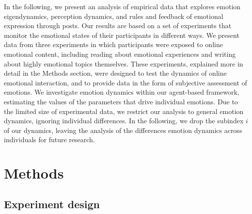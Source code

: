 \documentclass[nologo,url,11pt,a4paper]{ETHpaper}
\begin{document}
In the following, we present an analysis of empirical data that explores emotion eigendynamics, perception dynamics, and rules and feedback of emotional expression through posts. 
Our results are based on a set of experiments that monitor the emotional states of their
participants in different ways.   
We present data from three experiments in which participants were exposed to online emotional content, including reading about emotional experiences and writing about highly emotional topics themselves. 
These experiments, explained more in detail in the Methods section, were designed to test the dynamics of online emotional interaction, and to provide data in the form of subjective assessment of emotions. 
We investigate emotion dynamics within our agent-based framework, estimating the values of the parameters that drive individual emotions.  
Due to the limited size of experimental data, we restrict our analysis to general emotion dynamics, ignoring individual differences. In the following, we drop the subindex $i$ of our dynamics, leaving the analysis of the differences emotion dynamics across individuals for future research.


\section{Methods}

\subsection{Experiment design}
\end{document}
